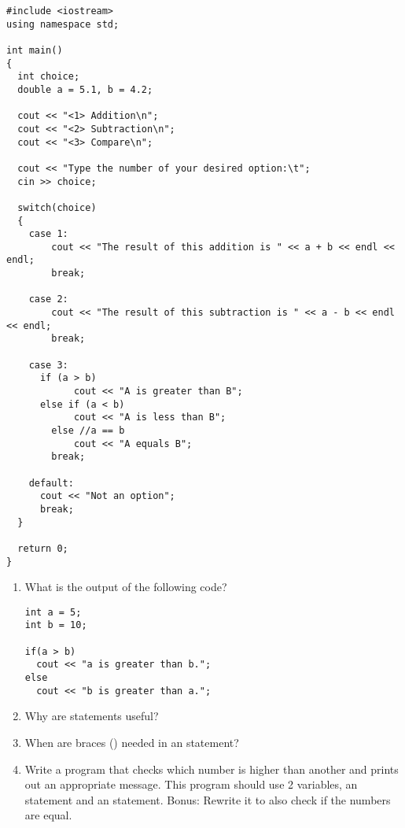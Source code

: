 \noindent\begin{minipage}{\linewidth}\begin{lstlisting}
#include <iostream>
using namespace std;

int main()
{
  int choice;
  double a = 5.1, b = 4.2;

  cout << "<1> Addition\n";
  cout << "<2> Subtraction\n";
  cout << "<3> Compare\n";

  cout << "Type the number of your desired option:\t";
  cin >> choice;

  switch(choice)
  {
    case 1:
	    cout << "The result of this addition is " << a + b << endl << endl;
	    break;

    case 2:
	    cout << "The result of this subtraction is " << a - b << endl << endl;
	    break;

    case 3:
      if (a > b)
		    cout << "A is greater than B";
      else if (a < b)
		    cout << "A is less than B";
	    else //a == b
		    cout << "A equals B";
	    break;

    default:
      cout << "Not an option";
      break;
  }

  return 0;
}
\end{lstlisting}\end{minipage}








\begin{enumerate}
\item What is the output of the following code?

\noindent\begin{minipage}{\linewidth}\begin{lstlisting}
int a = 5;
int b = 10;

if(a > b)
  cout << "a is greater than b.";
else
  cout << "b is greater than a.";
\end{lstlisting}\end{minipage}

\item Why are  statements useful?

\item When are braces (\Code{\{\}}) needed in an  statement?

\item Write a program that checks which number is higher than another and prints out an appropriate message. This program should use 2 variables, an  statement and an  statement. Bonus: Rewrite it to also check if the numbers are equal.

\end{enumerate}

